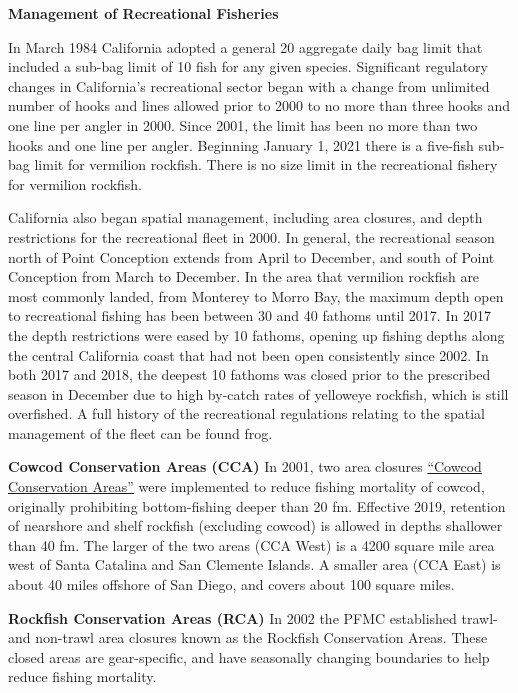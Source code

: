\documentclass[
  english,
  a4paper,
]{article}
\begin{document}
\textbf{Management of Recreational Fisheries}

In March 1984 California adopted a general 20 aggregate daily bag limit that included a sub-bag limit of 10 fish for any given species. Significant regulatory changes in California's
recreational sector began with a change
from unlimited number of hooks and lines allowed prior to 2000 to no more than
three hooks and one line per angler in 2000. Since 2001, the limit has been no more than
two hooks and one line per angler. Beginning January 1, 2021 there is a five-fish sub-bag limit for vermilion rockfish. There is no size limit in the recreational fishery
for vermilion rockfish.

California also began spatial management, including area closures, and depth
restrictions for the recreational fleet in 2000. In general, the recreational
season north of Point Conception
extends from April to December, and south of Point Conception from March to December.
In the area that vermilion rockfish are most commonly landed, from Monterey to Morro Bay, the
maximum depth open to recreational fishing has been between 30 and 40
fathoms until 2017. In 2017 the depth restrictions were eased by 10 fathoms,
opening up fishing depths along the central California coast that had not been
open consistently since 2002. In
both 2017 and 2018, the deepest 10 fathoms was closed prior to the prescribed
season in December due to high by-catch rates of yelloweye rockfish, which is still
overfished. A full history of the recreational
regulations relating to the spatial management of the fleet can be found frog.

\textbf{Cowcod Conservation Areas (CCA)}
In 2001, two area closures \href{https://nrm.dfg.ca.gov/FileHandler.ashx?DocumentID=36132\&inline}{``Cowcod Conservation Areas''} were implemented to reduce fishing mortality of cowcod, originally prohibiting bottom-fishing deeper than 20 fm. Effective 2019, retention of nearshore and shelf rockfish (excluding cowcod) is allowed in depths shallower than 40 fm. The larger of the two areas (CCA West) is a 4200 square mile area west of Santa Catalina and San Clemente Islands. A smaller area (CCA East) is about 40 miles offshore of San Diego, and covers about 100 square miles.

\textbf{Rockfish Conservation Areas (RCA)}
In 2002 the PFMC established trawl- and non-trawl area closures known as the Rockfish Conservation Areas. These closed areas are gear-specific, and have seasonally changing boundaries to help reduce fishing mortality.
\end{document}
